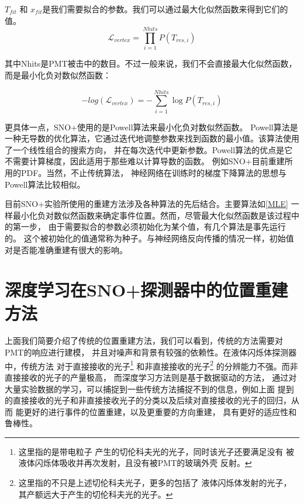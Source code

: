 $T_{fit}$ 和 $x_{fit}$是我们需要拟合的参数。我们可以通过最大化似然函数来得到它们的值。
\begin{equation}
\mathcal{L}_{vertex} = \prod_{i=1}^{Nhits} P(T_{res,i})
\end{equation}

其中Nhits是PMT被击中的数目。不过一般来说，我们不会直接最大化似然函数，而是最小化负对数似然函数：

\begin{equation}
-log(\mathcal{L}_{vertex}) = -\sum_{i=1}^{Nhits} \log P(T_{res,i})
\label{MLE}
\end{equation}

更具体一点，SNO+使用的是Powell算法\cite{powell1964efficient}来最小化负对数似然函数。
Powell算法是一种无导数的优化算法，它通过迭代地调整参数来找到函数的最小值。该算法使用了一个线性组合的搜索方向，
并在每次迭代中更新参数。Powell算法的优点是它不需要计算梯度，因此适用于那些难以计算导数的函数。
例如SNO+目前重建所用的PDF。当然，不止传统算法，
神经网络在训练时的梯度下降算法的思想与Powell算法比较相似。

目前SNO+实验所使用的重建方法涉及各种算法的先后结合。\cite{Allega_2024}主要算法如\ref{MLE}
一样最小化负对数似然函数来确定事件位置。然而，尽管最大化似然函数是该过程中的第一步，
由于需要拟合的参数必须初始化为某个值，有几个算法是事先运行的。
这个被初始化的值通常称为种子。与神经网络反向传播的情况一样，初始值对是否能准确重建有很大的影响。


\section{深度学习在SNO+探测器中的位置重建方法}\label{sec:dl_reconstruction}

上面我们简要介绍了传统的位置重建方法，我们可以看到，传统的方法需要对PMT的响应进行建模，
并且对噪声和背景有较强的依赖性。在液体闪烁体探测器中，传统方法
对于直接接收的光子\footnote{这里指的是带电粒子
产生的切伦科夫光的光子，同时该光子还要满足没有
被液体闪烁体吸收并再次发射，且没有被PMT的玻璃外壳
反射。}
和非直接接收的光子\footnote{这里指的不只是上述切伦科夫光子，更多的包括了
液体闪烁体发射的光子，其产额远大于产生的切伦科夫光的光子。}
的分辨能力不强。而非直接接收的光子的产量极高，
而深度学习方法则是基于数据驱动的方法，
通过对大量实验数据的学习，可以捕捉到一些传统方法捕捉不到的信息，例如上面
提到的直接接收的光子和非直接接收光子的分类以及后续对直接接收的光子的回归，从而
能更好的进行事件的位置重建，以及更重要的方向重建，
具有更好的适应性和鲁棒性。

